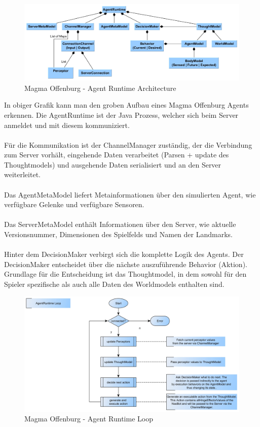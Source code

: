 \documentclass[fontsize=12pt,a4paper,final]{scrartcl}[2003/01/01]
\begin{document}
\begin{figure}[H]
	\centering
	\includegraphics[width=\textwidth]{Grafiken/Magma/AgentRuntime_Structure}
	\caption{Magma Offenburg - Agent Runtime Architecture}
	\label{fig:Magma - Agent Runtime Struktur}
\end{figure}

In obiger Grafik kann man den groben Aufbau eines Magma Offenburg Agents erkennen. Die AgentRuntime ist der Java Prozess, welcher sich beim Server anmeldet und mit diesem kommuniziert. \\
\\
Für die Kommunikation ist der ChannelManager zuständig,  der die Verbindung zum Server vorhält, eingehende Daten verarbeitet (Parsen + update des Thoughtmodels) und ausgehende Daten serialisiert und an den Server weiterleitet.\\
\\
Das AgentMetaModel liefert Metainformationen über den simulierten Agent, wie verfügbare Gelenke und verfügbare Sensoren.\\
\\
Das ServerMetaModel enthält Informationen über den Server, wie aktuelle Versionsnummer, Dimensionen des Spielfelds und Namen der Landmarks.\\
\\
Hinter dem DecisionMaker verbirgt sich die komplette Logik des Agents. Der DecisionMaker entscheidet über die nächste auszuführende Behavior (Aktion). Grundlage für die Entscheidung ist das Thoughtmodel, in dem sowohl für den Spieler spezifische als auch alle Daten des Worldmodels enthalten sind.

\begin{figure}[H]
	\centering
	\includegraphics[width=\textwidth]{Grafiken/Magma/AgentRuntime_Loop}
	\caption{Magma Offenburg - Agent Runtime Loop}
	\label{fig:Magma - Agent Runtime Loop}
\end{figure}
\end{document}
